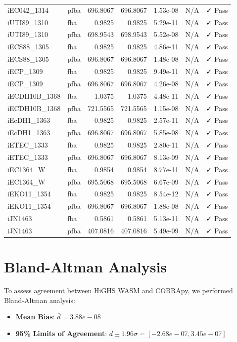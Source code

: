 \documentclass{article}
\begin{document}
\begin{table}[h]
{\begin{tabular}{llrrrrr}
iEC042_1314 & pfba & 696.8067 & 696.8067 & 1.53e-08 & N/A & ✓ Pass \\
iUTI89_1310 & fba & 0.9825 & 0.9825 & 5.29e-11 & N/A & ✓ Pass \\
iUTI89_1310 & pfba & 698.9543 & 698.9543 & 5.52e-08 & N/A & ✓ Pass \\
iECS88_1305 & fba & 0.9825 & 0.9825 & 4.86e-11 & N/A & ✓ Pass \\
iECS88_1305 & pfba & 696.8067 & 696.8067 & 1.48e-08 & N/A & ✓ Pass \\
iECP_1309 & fba & 0.9825 & 0.9825 & 9.49e-11 & N/A & ✓ Pass \\
iECP_1309 & pfba & 696.8067 & 696.8067 & 4.26e-08 & N/A & ✓ Pass \\
iECDH10B_1368 & fba & 1.0375 & 1.0375 & 4.48e-11 & N/A & ✓ Pass \\
iECDH10B_1368 & pfba & 721.5565 & 721.5565 & 1.15e-08 & N/A & ✓ Pass \\
iEcDH1_1363 & fba & 0.9825 & 0.9825 & 2.57e-11 & N/A & ✓ Pass \\
iEcDH1_1363 & pfba & 696.8067 & 696.8067 & 5.85e-08 & N/A & ✓ Pass \\
iETEC_1333 & fba & 0.9825 & 0.9825 & 2.80e-11 & N/A & ✓ Pass \\
iETEC_1333 & pfba & 696.8067 & 696.8067 & 8.13e-09 & N/A & ✓ Pass \\
iEC1364_W & fba & 0.9854 & 0.9854 & 8.77e-11 & N/A & ✓ Pass \\
iEC1364_W & pfba & 695.5068 & 695.5068 & 6.67e-09 & N/A & ✓ Pass \\
iEKO11_1354 & fba & 0.9825 & 0.9825 & 8.54e-12 & N/A & ✓ Pass \\
iEKO11_1354 & pfba & 696.8067 & 696.8067 & 1.88e-08 & N/A & ✓ Pass \\
iJN1463 & fba & 0.5861 & 0.5861 & 5.13e-11 & N/A & ✓ Pass \\
iJN1463 & pfba & 407.0816 & 407.0816 & 5.49e-09 & N/A & ✓ Pass \\
\bottomrule
\end{tabular}%
}
\end{table}

\section{Bland-Altman Analysis}

To assess agreement between HiGHS WASM and COBRApy, we performed Bland-Altman analysis:

\begin{itemize}
    \item \textbf{Mean Bias}: $\bar{d} = 3.88e-08$
    \item \textbf{95\% Limits of Agreement}: $\bar{d} \pm 1.96\sigma = [-2.68e-07, 3.45e-07]$
\end{itemize}
\end{document}
